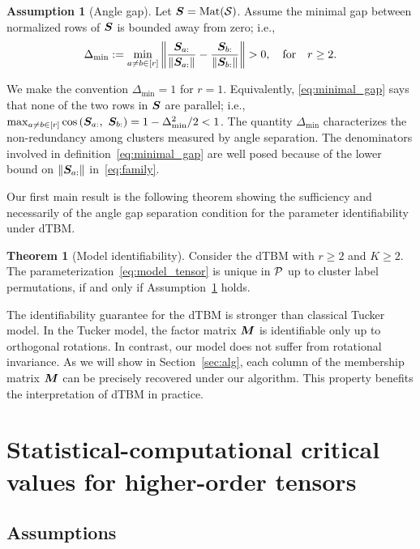 \documentclass[journal]{IEEEtran}
\theoremstyle{definition}
\newtheorem{thm}{Theorem}
\theoremstyle{definition}
\newtheorem{assumption}{Assumption}
\newcommand{\of}[1]{\left(#1\right)}
\begin{document}
\begin{assumption}[Angle gap] \label{assmp:min_gap}Let $\bm S = \text{Mat}(\mathcal{S})$. Assume the minimal gap between normalized rows of $\bm S$ is bounded away from zero; i.e.,
\begin{equation}\label{eq:minimal_gap}
    \Delta_{\min} := \min_{a \neq b \in [r]} \onorm{\frac{\mS_{a:}}{\onormSize{}{ \mS_{a:}}} - \frac{\mS_{b:}}{\onormSize{}{ \mS_{b:}}} }>0, \quad \text{for} \quad r \geq 2.
\end{equation}
\end{assumption}
We make the convention $\Delta_{\min} = 1$ for $r = 1$. Equivalently, \eqref{eq:minimal_gap} says that none of the two rows in $\bm S$ are parallel; i.e., $\max_{a \neq b\in [r]}\cos \of{\mS_{a:},\  \mS_{b:}}  = 1-\Delta^2_{\min}/2<1$. The quantity $\Delta_{\min}$ characterizes the non-redundancy among clusters measured by angle separation. The denominators involved in definition~\eqref{eq:minimal_gap} are well posed because of the lower bound on $\left\lVert\bm S_{a:}\right\rVert$ in~\eqref{eq:family}. 

Our first main result is the following theorem showing the sufficiency and necessarily of the angle gap separation condition for the parameter identifiability under dTBM. 

\begin{thm}[Model identifiability]\label{thm:unique} Consider the dTBM with $r\geq 2$ {and $K \geq 2$}. The parameterization~\eqref{eq:model_tensor} is unique in $\mathcal{P}$ up to cluster label permutations, if and only if Assumption~\ref{assmp:min_gap} holds.
\end{thm}

The identifiability guarantee for the dTBM is stronger than classical Tucker model. In the Tucker model, the factor matrix $\bm M$ is identifiable only up to orthogonal rotations. In contrast, our model does not suffer from rotational invariance. As we will show in Section~\ref{sec:alg}, each column of the membership matrix $\bm M$ can be precisely recovered under our algorithm. This property benefits the interpretation of dTBM in practice. 


\section{Statistical-computational critical values for higher-order tensors}\label{sec:limits}


\subsection{Assumptions} \label{sec:prelim}
\end{document}
